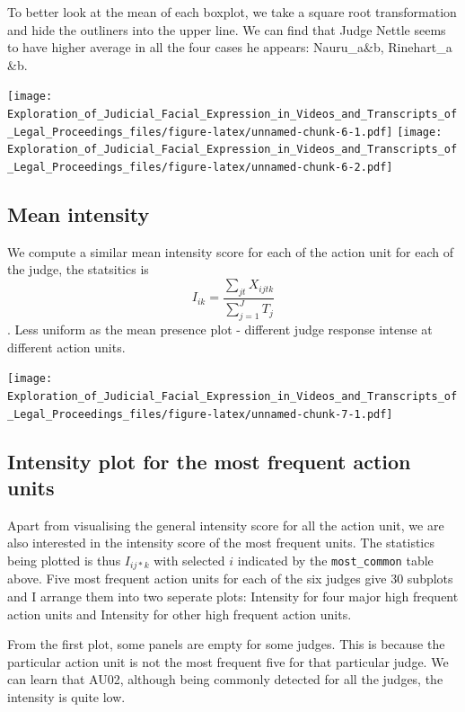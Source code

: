 \documentclass{monashthesis}
\begin{document}
To better look at the mean of each boxplot, we take a square root transformation and hide the outliners into the upper line. We can find that Judge Nettle seems to have higher average in all the four cases he appears: Nauru\_a\&b, Rinehart\_a \&b.

\texttt{[image: Exploration\_of\_Judicial\_Facial\_Expression\_in\_Videos\_and\_Transcripts\_of\_Legal\_Proceedings\_files/figure-latex/unnamed-chunk-6-1.pdf]} \texttt{[image: Exploration\_of\_Judicial\_Facial\_Expression\_in\_Videos\_and\_Transcripts\_of\_Legal\_Proceedings\_files/figure-latex/unnamed-chunk-6-2.pdf]}

\hypertarget{mean-intensity}{%
\subsection{Mean intensity}\label{mean-intensity}}

We compute a similar mean intensity score for each of the action unit for each of the judge, the statsitics is \[I_{ik} = \frac{\sum_{jt}X_{ijtk}}{\sum_{j = 1}^JT_j}\]. Less uniform as the mean presence plot - different judge response intense at different action units.

\texttt{[image: Exploration\_of\_Judicial\_Facial\_Expression\_in\_Videos\_and\_Transcripts\_of\_Legal\_Proceedings\_files/figure-latex/unnamed-chunk-7-1.pdf]}

\hypertarget{intensity-plot-for-the-most-frequent-action-units}{%
\subsection{Intensity plot for the most frequent action units}\label{intensity-plot-for-the-most-frequent-action-units}}

Apart from visualising the general intensity score for all the action unit, we are also interested in the intensity score of the most frequent units. The statistics being plotted is thus \(I_{ij*k}\) with selected \(i\) indicated by the \texttt{most\_common} table above. Five most frequent action units for each of the six judges give 30 subplots and I arrange them into two seperate plots: Intensity for four major high frequent action units and Intensity for other high frequent action units.

From the first plot, some panels are empty for some judges. This is because the particular action unit is not the most frequent five for that particular judge. We can learn that AU02, although being commonly detected for all the judges, the intensity is quite low.
\end{document}
